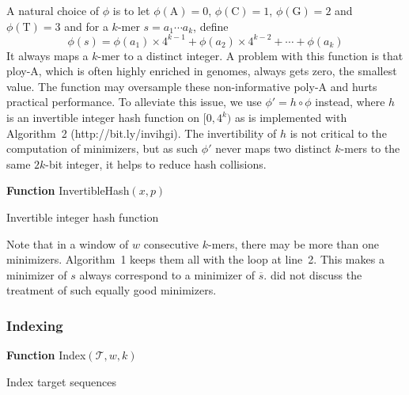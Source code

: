 \documentclass{bioinfo}
\begin{document}
\begin{methods}
A natural choice of $\phi$ is to let $\phi(\mathrm{A})=0$,
$\phi(\mathrm{C})=1$, $\phi(\mathrm{G})=2$ and $\phi(\mathrm{T})=3$ and for a
$k$-mer $s=a_1\cdots a_k$, define
$$
\phi(s)=\phi(a_1)\times4^{k-1}+\phi(a_2)\times4^{k-2}+\cdots+\phi(a_k)
$$
It always maps a $k$-mer to a distinct integer. A problem with this function is
that ploy-A, which is often highly enriched in genomes, always gets zero, the
smallest value. The function may oversample these non-informative poly-A and
hurts practical performance. To alleviate this issue, we use $\phi'=h\circ\phi$
instead, where $h$ is an invertible integer hash function on $[0,4^k)$ as is
implemented with Algorithm~2 (http://bit.ly/invihgi). The invertibility of $h$
is not critical to the computation of minimizers, but as such $\phi'$ never
maps two distinct $k$-mers to the same $2k$-bit integer, it helps to reduce
hash collisions.

\begin{algorithm}[ht]
\DontPrintSemicolon
\footnotesize
{}
\BlankLine
\textbf{Function} {\sc InvertibleHash}$(x,p)$
\caption{Invertible integer hash function}
\end{algorithm}

Note that in a window of $w$ consecutive $k$-mers, there may be more than one
minimizers. Algorithm~1 keeps them all with the loop at line~2. This makes a
minimizer of $s$ always correspond to a minimizer of $\overline{s}$.
\citet{Roberts:2004fv} did not discuss the treatment of such equally good
minimizers.

\subsubsection{Indexing}

\begin{algorithm}[ht]
\DontPrintSemicolon
\footnotesize
{}
\BlankLine
\textbf{Function} {\sc Index}$(\mathcal{T},w,k)$
\caption{Index target sequences}
\end{algorithm}


\end{methods}
\end{document}
